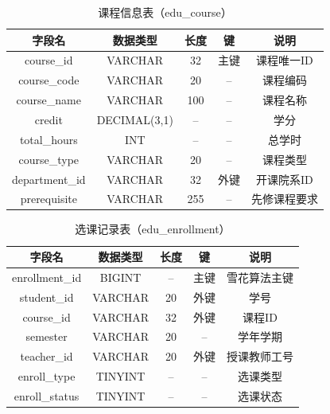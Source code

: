 \documentclass[12pt, a4paper]{academics}
\begin{document}
\begin{table}[h]
\centering
\caption{课程信息表（edu\_course）}
\begin{tabular}{|c|c|c|c|c|}
\hline
\textbf{字段名} & \textbf{数据类型} & \textbf{长度} & \textbf{键} & \textbf{说明} \\
\hline
course\_id & VARCHAR & 32 & 主键 & 课程唯一ID \\
course\_code & VARCHAR & 20 & -- & 课程编码 \\
course\_name & VARCHAR & 100 & -- & 课程名称 \\
credit & DECIMAL(3,1) & -- & -- & 学分 \\
total\_hours & INT & -- & -- & 总学时 \\
course\_type & VARCHAR & 20 & -- & 课程类型 \\
department\_id & VARCHAR & 32 & 外键 & 开课院系ID \\
prerequisite & VARCHAR & 255 & -- & 先修课程要求 \\
\hline
\end{tabular}
\end{table}

\begin{table}[h]
\centering
\caption{选课记录表（edu\_enrollment）}
\begin{tabular}{|c|c|c|c|c|}
\hline
\textbf{字段名} & \textbf{数据类型} & \textbf{长度} & \textbf{键} & \textbf{说明} \\
\hline
enrollment\_id & BIGINT & -- & 主键 & 雪花算法主键 \\
student\_id & VARCHAR & 20 & 外键 & 学号 \\
course\_id & VARCHAR & 32 & 外键 & 课程ID \\
semester & VARCHAR & 20 & -- & 学年学期 \\
teacher\_id & VARCHAR & 20 & 外键 & 授课教师工号 \\
enroll\_type & TINYINT & -- & -- & 选课类型 \\
enroll\_status & TINYINT & -- & -- & 选课状态 \\
\hline
\end{tabular}
\end{table}
\end{document}

